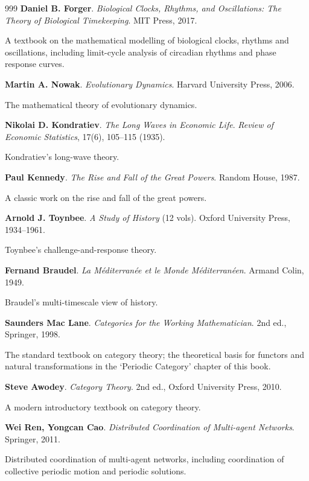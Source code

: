 \begin{thebibliography}{999}
 \textbf{Daniel B. Forger}. \textit{Biological Clocks, Rhythms, and Oscillations: The Theory of Biological Timekeeping}. MIT Press, 2017.

A textbook on the mathematical modelling of biological clocks, rhythms and oscillations, including limit-cycle analysis of circadian rhythms and phase response curves.

 \textbf{Martin A. Nowak}. \textit{Evolutionary Dynamics}. Harvard University Press, 2006.

The mathematical theory of evolutionary dynamics.

 \textbf{Nikolai D. Kondratiev}. \textit{The Long Waves in Economic Life}. \textit{Review of Economic Statistics}, 17(6), 105--115 (1935).

Kondratiev's long-wave theory.

 \textbf{Paul Kennedy}. \textit{The Rise and Fall of the Great Powers}. Random House, 1987.

A classic work on the rise and fall of the great powers.

 \textbf{Arnold J. Toynbee}. \textit{A Study of History} (12 vols). Oxford University Press, 1934--1961.

Toynbee's challenge-and-response theory.

 \textbf{Fernand Braudel}. \textit{La M\'editerran\'ee et le Monde M\'editerran\'een}. Armand Colin, 1949.

Braudel's multi-timescale view of history.

 \textbf{Saunders Mac Lane}. \textit{Categories for the Working Mathematician}. 2nd ed., Springer, 1998.

The standard textbook on category theory; the theoretical basis for functors and natural transformations in the `Periodic Category' chapter of this book.

 \textbf{Steve Awodey}. \textit{Category Theory}. 2nd ed., Oxford University Press, 2010.

A modern introductory textbook on category theory.

 \textbf{Wei Ren, Yongcan Cao}. \textit{Distributed Coordination of Multi-agent Networks}. Springer, 2011.

Distributed coordination of multi-agent networks, including coordination of collective periodic motion and periodic solutions.


\end{thebibliography}
